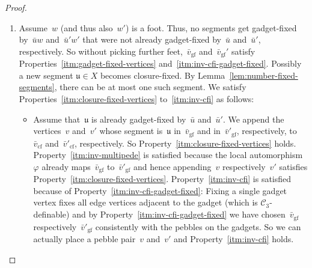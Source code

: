 \documentclass[]{lmcs}
\renewcommand{\phi}{\varphi}
\newcommand{\autoA}{\phi}
\newcommand{\tup}[1]{\bar{#1}}
\newcommand{\vertA}{u}
\newcommand{\vertB}{v}
\newcommand{\vertC}{w}
\newcommand{\Ck}[1]{\mathcal{C}_{#1}}
\newcommand{\bVertA}{\mathfrak{u}}
\newcommand{\footbsetA}{X}
\newcommand{\gadgetfixed}[1]{#1_{\text{gf}}}
\newcommand{\closurefixed}[1]{#1_{\text{cf}}}
\begin{document}
\begin{proof}
\begin{enumerate}[label=(\alph*)]
		\item Assume~$\vertC$ (and thus also~$\vertC'$) is a foot.
		Thus, no segments get gadget-fixed 
		by~$\tup{\vertA}\vertC$ and~$\tup{\vertA}'\vertC'$
		that were not already gadget-fixed by~$\tup{\vertA}$ and~$\tup{\vertA}'$, respectively.
		So without picking further feet,~$\gadgetfixed{\tup{\vertB}}$
		and~$\gadgetfixed{\tup{\vertB}}'$ satisfy
		Properties~\ref{itm:gadget-fixed-vertices} and~\ref{itm:inv-cfi-gadget-fixed}.
		Possibly a new segment $\bVertA \in \footbsetA$ becomes closure-fixed.
		By Lemma~\ref{lem:number-fixed-segments},
		there can be at most one such segment.
		We satisfy Properties~\ref{itm:closure-fixed-vertices} to~\ref{itm:inv-cfi}
		as follows:
		\begin{itemize}
		\item Assume that~$\bVertA$ is already gadget-fixed by~$\tup{\vertA}$ and~$\tup{\vertA}'$.
		We append the vertices~$\vertB$ and~$\vertB'$
		whose segment is~$\bVertA$ in~$\gadgetfixed{\tup{\vertB}}$
		and in~$\gadgetfixed{\tup{\vertB}'}$, respectively,
		to~$\closurefixed{\tup{\vertB}}$ and~$\closurefixed{\tup{\vertB}'}$,
		respectively.
		So Property~\ref{itm:closure-fixed-vertices} holds.
		Property~\ref{itm:inv-multipede} is satisfied because
		the local automorphism~$\autoA$ already maps~$\gadgetfixed{\tup{\vertB}}$ to~$\gadgetfixed{\tup{\vertB}'}$
		and hence appending~$\vertB$ respectively~$\vertB'$ satisfies Property~\ref{itm:closure-fixed-vertices}.
		Property~\ref{itm:inv-cfi} is satisfied because of 
		Property~\ref{itm:inv-cfi-gadget-fixed}:
		Fixing a single gadget vertex fixes all edge vertices
		adjacent to the gadget (which is $\Ck{3}$-definable)
		and by Property~\ref{itm:inv-cfi-gadget-fixed}
		we have chosen~$\gadgetfixed{\tup{\vertB}}$
		respectively~$\gadgetfixed{\tup{\vertB}'}$
		consistently with the pebbles on the gadgets.
		So we can actually place a pebble pair~$\vertB$ and~$\vertB'$
		and Property~\ref{itm:inv-cfi} holds.
		

\end{itemize}
\end{enumerate}
\end{proof}
\end{document}
